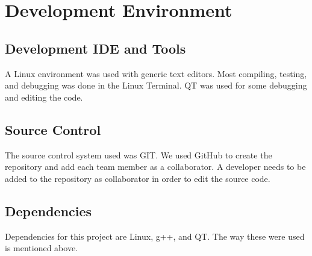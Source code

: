 \chapter{Development Environment}

\section{Development IDE and Tools}
A Linux environment was used with generic text editors. Most compiling, testing, and debugging was done in the Linux Terminal. QT was used for some debugging and editing the code. 

\section{Source  Control}
The source control system used was GIT. We used GitHub to create the repository and add each team member as a collaborator. A developer needs to be added to the repository as collaborator in order to edit the source code. 

\section{Dependencies}
Dependencies for this project are Linux, g++, and QT. The way these were used is mentioned above. 



